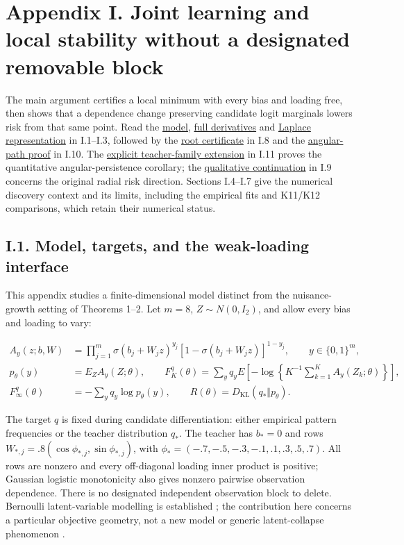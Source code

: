 \documentclass{article}
\begin{document}
\clearpage

\section*{Appendix I. Joint learning and local stability without a
designated removable
block}\label{appendix-i.-joint-learning-and-local-stability-without-a-designated-removable-block}

The main argument certifies a local minimum with every bias and loading
free, then shows that a dependence change preserving candidate logit
marginals lowers risk from that same point. Read the
\hyperref[dense-model]{model}, \hyperref[full-derivatives]{full
derivatives} and \hyperref[laplace-representation]{Laplace
representation} in I.1--I.3, followed by the
\hyperref[proof-theorem-3]{root certificate} in I.8 and the
\hyperref[same-root-angle]{angular-path proof} in I.10. The
\hyperref[quantitative-teacher-family]{explicit teacher-family
extension} in I.11 proves the quantitative angular-persistence
corollary; the \hyperref[local-persistence]{qualitative continuation} in
I.9 concerns the original radial risk direction. Sections I.4--I.7 give
the numerical discovery context and its limits, including the empirical
fits and K11/K12 comparisons, which retain their numerical status.

\subsection*{I.1. Model, targets, and the weak-loading
interface}\label{dense-model}

This appendix studies a finite-dimensional model distinct from the
nuisance-growth setting of Theorems 1--2. Let \(m=8\),
\(Z\sim N(0,I_2)\), and allow every bias and loading to vary:

\[
\begin{aligned}
A_y(z;b,W)&=\prod_{j=1}^m\sigma(b_j+W_jz)^{y_j}
[1-\sigma(b_j+W_jz)]^{1-y_j},\qquad y\in\{0,1\}^m,\\
p_\theta(y)&=E_ZA_y(Z;\theta),\qquad
F_K^q(\theta)=\sum_yq_yE\left[-\log\left\{K^{-1}\sum_{k=1}^KA_y(Z_k;\theta)\right\}\right],\\
F_\infty^q(\theta)&=-\sum_yq_y\log p_\theta(y),\qquad
R(\theta)=D_{\mathrm{KL}}(q_*\Vert p_\theta).
\end{aligned}
\tag{I.1}
\]

The target \(q\) is fixed during candidate differentiation: either
empirical pattern frequencies or the teacher distribution \(q_*\). The
teacher has \(b_*=0\) and rows
\(W_{*,j}=.8(\cos\phi_{*,j},\sin\phi_{*,j})\), with
\(\phi_*=(-.7,-.5,-.3,-.1,.1,.3,.5,.7)\). All rows are nonzero and every
off-diagonal loading inner product is positive; Gaussian logistic
monotonicity also gives nonzero pairwise observation dependence. There
is no designated independent observation block to delete. Bernoulli
latent-variable modelling is established \citep{tipping1998}; the
contribution here concerns a particular objective geometry, not a new
model or generic latent-collapse phenomenon
\citep{burda2016, lucas2019, urban2021}.
\end{document}
